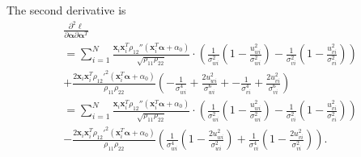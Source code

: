 \documentclass[aap,authoryear, preprint]{imsart}
\numberwithin{equation}{section}
\theoremstyle{plain}
\begin{document}
\noindent The second derivative is
\begin{equation}
    \begin{multlined}
    \frac{\partial^2 \ell}{\partial \bm{\alpha} \partial \bm{\alpha}^T}\\
    = \sum_{i=1}^{N} \frac{\bm{x}_i \bm{x}_i^T \rho_{12}''(\bm{x}_i^T\bm{\alpha}+\alpha_0)}{\sqrt{\rho_{11}\rho_{22}}} \cdot
    \left(
    \frac{1}{\sigma_{wi}^2} \left( 1 - \frac{u_{wi}^2}{\sigma_{wi}^2}\right) - 
    \frac{1}{\sigma_{vi}^2} \left( 1 - \frac{u_{vi}^2}{\sigma_{vi}^2} \right)
    \right)\\
    + \frac{2\bm{x}_i \bm{x}_i^T {\rho_{12}'}^2(\bm{x}_i^T\bm{\alpha} + \alpha_0)}{\rho_{11}\rho_{22}}
    \left(
    -\frac{1}{\sigma_{wi}^4} + \frac{2u_{wi}^2}{\sigma_{wi}^6} +
    -\frac{1}{\sigma_{vi}^4} + \frac{2u_{vi}^2}{\sigma_{vi}^6}
    \right)\\
    = \sum_{i=1}^{N} \frac{\bm{x}_i \bm{x}_i^T \rho_{12}''(\bm{x}_i^T\bm{\alpha}+\alpha_0)}{\sqrt{\rho_{11}\rho_{22}}} \cdot
    \left(
    \frac{1}{\sigma_{wi}^2} \left( 1 - \frac{u_{wi}^2}{\sigma_{wi}^2}\right) - 
    \frac{1}{\sigma_{vi}^2} \left( 1 - \frac{u_{vi}^2}{\sigma_{vi}^2} \right)
    \right)\\
    - \frac{2\bm{x}_i \bm{x}_i^T {\rho_{12}'}^2(\bm{x}_i^T\bm{\alpha}+\alpha_0)}{\rho_{11}\rho_{22}}
    \left(
    \frac{1}{\sigma_{wi}^4} \left(1-\frac{2u_{wi}^2}{\sigma_{wi}^2}\right)+
    \frac{1}{\sigma_{vi}^4} \left(1-\frac{2u_{vi}^2}{\sigma_{vi}^2}\right)
    \right).
    \end{multlined}
\end{equation}
\end{document}
